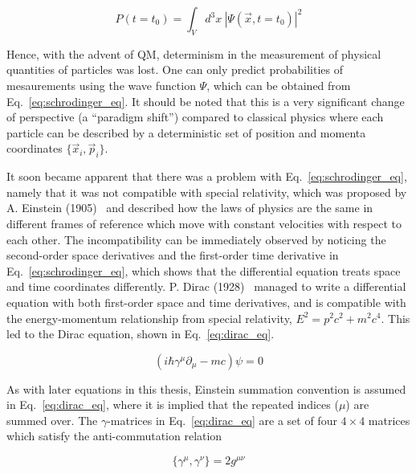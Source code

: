 \begin{equation}
    P(t=t_0)  = \int_{V} d^3 x \ |\Psi(\vec{x}, t=t_0)|^2 
\end{equation}

Hence, with the advent of QM, determinism in the measurement of physical quantities of particles was lost.
One can only predict probabilities of mesaurements using the wave function $\Psi$, which can
be obtained from Eq.~\ref{eq:schrodinger_eq}. It should be noted that this is a very significant change 
of perspective (a ``paradigm shift'') compared to classical physics where each particle can be described
by a deterministic set of position and momenta coordinates $\{\vec{x}_i, \vec{p}_i\}$. 

It soon became apparent that there was a problem with Eq.~\ref{eq:schrodinger_eq}, namely that it was not compatible
with special relativity, which was proposed by A. Einstein (1905)~\cite{Einstein:1905ve} 
and described how the laws of physics are the same
in different frames of reference which move with constant velocities with respect to each other. The incompatibility
can be immediately observed by noticing the second-order space derivatives and the first-order time derivative in
Eq.~\ref{eq:schrodinger_eq}, which shows that the differential equation treats space and time coordinates differently.
P. Dirac (1928)~\cite{Dirac:1928hu} managed to write a differential equation with both first-order space and 
time derivatives, and is compatible
with the energy-momentum relationship from special relativity, $E^2 = p^2 c^2 + m^2 c^4$. This led to the Dirac equation,
shown in Eq.~\ref{eq:dirac_eq}.

\begin{equation}
    \left( i\hbar \gamma^{\mu} \partial_{\mu} - mc \right) \psi = 0
    \label{eq:dirac_eq}
\end{equation}

As with later equations in this thesis, Einstein summation convention is assumed in Eq.~\ref{eq:dirac_eq},
where it is implied that the repeated indices ($\mu$) are summed over.
The $\gamma$-matrices in Eq.~\ref{eq:dirac_eq} are a set of four $4\times 4$ matrices 
which satisfy the anti-commutation relation

\begin{equation}
    \{\gamma^{\mu}, \gamma^{\nu} \} = 2g^{\mu\nu}
\end{equation}


